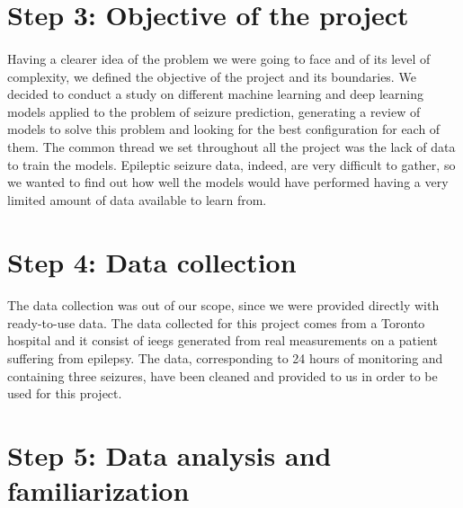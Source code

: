 
\section{Step 3: Objective of the project} \label{sec: step_objective_project}
\paragraph{} Having a clearer idea of the problem we were going to face and of its level of complexity, we defined the objective of the project and its boundaries. We decided to conduct a study on different machine learning and deep learning models applied to the problem of seizure prediction, generating a review of models to solve this problem and looking for the best configuration for each of them. The common thread we set throughout all the project was the lack of data to train the models. Epileptic seizure data, indeed, are very difficult to gather, so we wanted to find out how well the models would have performed having a very limited amount of data available to learn from.


\section{Step 4: Data collection} \label{sec: step_data_collection}
\paragraph{} The data collection was out of our scope, since we were provided directly with ready-to-use data. The data collected for this project comes from a Toronto hospital and it consist of \acsp{ieeg} generated from real measurements on a patient suffering from epilepsy. The data, corresponding to 24 hours of monitoring and containing three seizures, have been cleaned and provided to us in order to be used for this project.


\section{Step 5: Data analysis and familiarization} \label{sec: step_data_analysis_familiarization}
